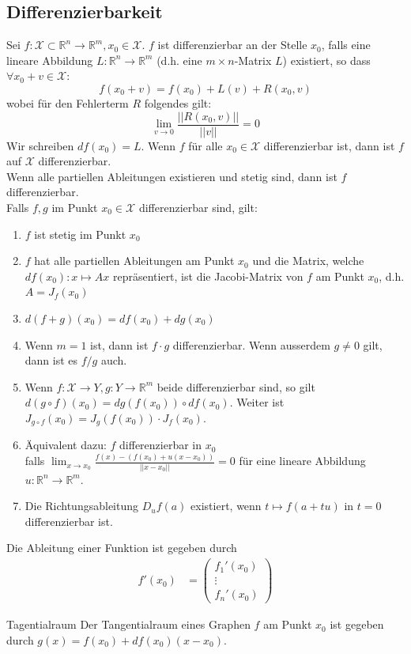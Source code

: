 \documentclass[a4paper,10pt]{article}
\def\R{\mathbb{R}}
\def\X{\mathcal{X}}
\begin{document}
\subsection{Differenzierbarkeit}
Sei \(f: \X \subset \R^n \to \R^m, x_0 \in \X\). \(f\) ist differenzierbar an der Stelle \(x_0\), falls eine lineare Abbildung \(L: \R^n \to \R^m\) (d.h. eine \(m \times n\)-Matrix \(L\)) existiert, so dass \(\forall x_0 + v \in \X\):
\[f(x_0 + v) = f(x_0) + L(v) + R(x_0,v)\]
wobei für den Fehlerterm \(R\) folgendes gilt: 
\[\lim_{v \to 0} \frac{||R(x_0,v)||}{||v||} = 0\]
Wir schreiben \(df(x_0) = L\). Wenn \(f\) für alle \(x_0 \in \X\) differenzierbar ist, dann ist \(f\) auf \(\X\) differenzierbar. \\
Wenn alle partiellen Ableitungen existieren und stetig sind, dann ist \(f\) differenzierbar.\\
Falls \(f,g\) im Punkt \(x_0 \in \X\) differenzierbar sind, gilt:
\begin{enumerate}
  \item \(f\) ist stetig im Punkt \(x_0\)
  \item \(f\) hat alle partiellen Ableitungen am Punkt \(x_0\) und die Matrix, welche \(df(x_0): x \mapsto Ax\) repräsentiert, ist die Jacobi-Matrix von \(f\) am Punkt \(x_0\), d.h. \(A = J_f(x_0)\)
  \item \(d(f+g)(x_0) = df(x_0) + dg(x_0)\)
  \item Wenn \(m = 1\) ist, dann ist \(f\cdot g\) differenzierbar. Wenn ausserdem \(g \ne 0\) gilt, dann ist es \(f/g\) auch.
  \item Wenn \(f: \X \to Y, g: Y \to \R^m\) beide differenzierbar sind, so gilt \(d(g \circ f)(x_0) = dg(f(x_0)) \circ df(x_0)\). 
  Weiter ist \(J_{g \circ f}(x_0) = J_g(f(x_0)) \cdot J_f(x_0)\).
  \item Äquivalent dazu: $f$ differenzierbar in $x_0$\\
  falls $\lim_{x \rightarrow x_0} \frac{f(x) - (f(x_0) + u(x - x_0))}{||x - x_0||} = 0$ für eine lineare Abbildung $u: \mathbb{R}^n \rightarrow \mathbb{R}^m$.
  \item Die Richtungsableitung $D_u f(a)$ existiert, wenn $t \mapsto f(a + tu)$ in $t = 0$ differenzierbar ist.
\end{enumerate}
Die Ableitung einer Funktion ist gegeben durch
\begin{align*}
  f'(x_0) &= \begin{pmatrix}
    f_1'(x_0)\\
    \vdots\\
    f_n'(x_0)
  \end{pmatrix}
\end{align*}
\begin{subbox}{Tagentialraum}
  Der Tangentialraum eines Graphen \(f\) am Punkt \(x_0\) ist gegeben durch \(g(x) = f(x_0) + df(x_0)(x-x_0)\).
\end{subbox}
\end{document}
